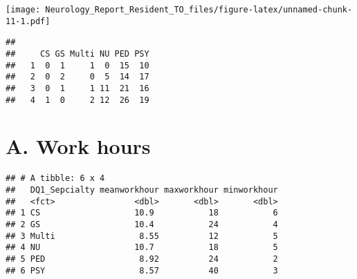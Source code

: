 \documentclass[]{book}
\newenvironment{Shaded}{\begin{snugshade}}{\end{snugshade}}
\newcommand{\DataTypeTok}[1]{\textcolor[rgb]{0.13,0.29,0.53}{#1}}
\newcommand{\DecValTok}[1]{\textcolor[rgb]{0.00,0.00,0.81}{#1}}
\newcommand{\KeywordTok}[1]{\textcolor[rgb]{0.13,0.29,0.53}{\textbf{#1}}}
\newcommand{\NormalTok}[1]{#1}
\newcommand{\OperatorTok}[1]{\textcolor[rgb]{0.81,0.36,0.00}{\textbf{#1}}}
\newcommand{\StringTok}[1]{\textcolor[rgb]{0.31,0.60,0.02}{#1}}
\begin{document}
\texttt{[image: Neurology\_Report\_Resident\_TO\_files/figure-latex/unnamed-chunk-11-1.pdf]}

\begin{Shaded}
\end{Shaded}

\begin{verbatim}
##    
##     CS GS Multi NU PED PSY
##   1  0  1     1  0  15  10
##   2  0  2     0  5  14  17
##   3  0  1     1 11  21  16
##   4  1  0     2 12  26  19
\end{verbatim}

\hypertarget{a.-work-hours}{%
\section{A. Work hours}\label{a.-work-hours}}

\begin{Shaded}
\end{Shaded}

\begin{verbatim}
## # A tibble: 6 x 4
##   DQ1_Sepcialty meanworkhour maxworkhour minworkhour
##   <fct>                <dbl>       <dbl>       <dbl>
## 1 CS                   10.9           18           6
## 2 GS                   10.4           24           4
## 3 Multi                 8.55          12           5
## 4 NU                   10.7           18           5
## 5 PED                   8.92          24           2
## 6 PSY                   8.57          40           3
\end{verbatim}
\end{document}
